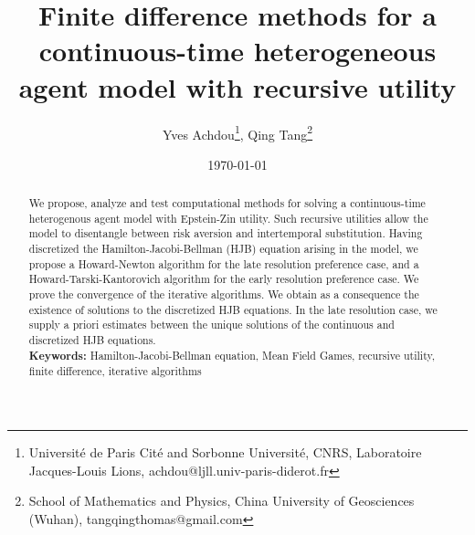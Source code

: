 \documentclass[11pt]{article}
\title{Finite difference methods for a continuous-time heterogeneous agent model with recursive utility}
\author{Yves Achdou\thanks{Universit\'{e} de Paris Cit\'{e} and Sorbonne Universit\'{e}, CNRS, Laboratoire Jacques-Louis Lions,  achdou@ljll.univ-paris-diderot.fr}, \quad Qing Tang\thanks{School of Mathematics and Physics, China University of Geosciences (Wuhan),  tangqingthomas@gmail.com}}
\date{\today}
\numberwithin{equation}{section}
\numberwithin{algorithm}{section}
\theoremstyle{plain}
\begin{document}
\maketitle

\begin{abstract} 
We propose, analyze and test computational methods for solving a continuous-time heterogenous agent model with Epstein-Zin utility. Such recursive utilities allow the model to disentangle between risk aversion and intertemporal substitution. Having discretized the Hamilton-Jacobi-Bellman (HJB) equation arising in the model, we propose a Howard-Newton algorithm for the late resolution preference case, and a Howard-Tarski-Kantorovich algorithm for the early resolution preference case. We prove the convergence of the iterative algorithms. We obtain as a consequence the existence of solutions to the discretized HJB equations. In the late resolution case, we supply a priori estimates between the unique solutions of the continuous and discretized HJB equations. \\
\textbf{Keywords:} Hamilton-Jacobi-Bellman equation, Mean Field Games, recursive utility, finite difference, iterative algorithms
\end{abstract}

	
\end{document}
